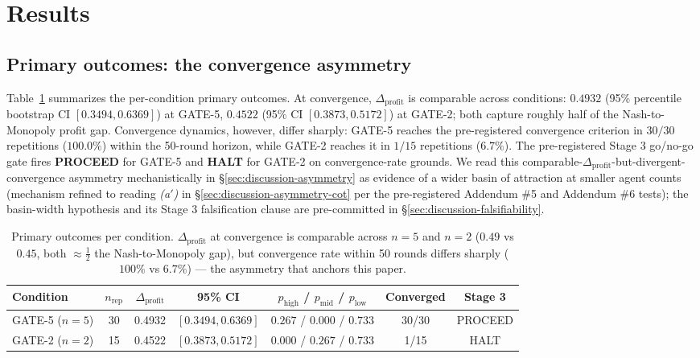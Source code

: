 \section{Results}
\label{sec:results}

\subsection{Primary outcomes: the convergence asymmetry}
\label{sec:results-primary}

Table~\ref{tab:primary-summary} summarizes the per-condition primary outcomes. At convergence, $\Delta_{\text{profit}}$ is comparable across conditions: $0.4932$ (95\% percentile bootstrap CI $[0.3494, 0.6369]$) at GATE-5, $0.4522$ (95\% CI $[0.3873, 0.5172]$) at GATE-2; both capture roughly half of the Nash-to-Monopoly profit gap. Convergence dynamics, however, differ sharply: GATE-5 reaches the pre-registered convergence criterion in $30/30$ repetitions ($100.0\%$) within the 50-round horizon, while GATE-2 reaches it in $1/15$ repetitions ($6.7\%$). The pre-registered Stage 3 go/no-go gate fires \textbf{PROCEED} for GATE-5 and \textbf{HALT} for GATE-2 on convergence-rate grounds. We read this comparable-$\Delta_{\text{profit}}$-but-divergent-convergence asymmetry mechanistically in \S\ref{sec:discussion-asymmetry} as evidence of a wider basin of attraction at smaller agent counts (mechanism refined to reading \emph{(a$'$)} in \S\ref{sec:discussion-asymmetry-cot} per the pre-registered Addendum \#5 and Addendum \#6 tests); the basin-width hypothesis and its Stage 3 falsification clause are pre-committed in \S\ref{sec:discussion-falsifiability}.

\begin{table}[h]
\centering
\caption{Primary outcomes per condition. $\Delta_{\text{profit}}$ at convergence is comparable across $n=5$ and $n=2$ ($0.49$ vs $0.45$, both $\approx \tfrac{1}{2}$ the Nash-to-Monopoly gap), but convergence rate within 50 rounds differs sharply ($100\%$ vs $6.7\%$) --- the asymmetry that anchors this paper.}
\label{tab:primary-summary}
\begin{tabular}{lcccccc}
\toprule
Condition & $n_{\text{rep}}$ & $\Delta_{\text{profit}}$ & 95\% CI & $p_{\text{high}}$ / $p_{\text{mid}}$ / $p_{\text{low}}$ & Converged & Stage 3 \\
\midrule
GATE-5 ($n = 5$) & 30 & 0.4932 & $[0.3494, 0.6369]$ & $0.267$ / $0.000$ / $0.733$ & 30/30 & PROCEED \\
GATE-2 ($n = 2$) & 15 & 0.4522 & $[0.3873, 0.5172]$ & $0.000$ / $0.267$ / $0.733$ & 1/15 & HALT \\
\bottomrule
\end{tabular}
\end{table}

